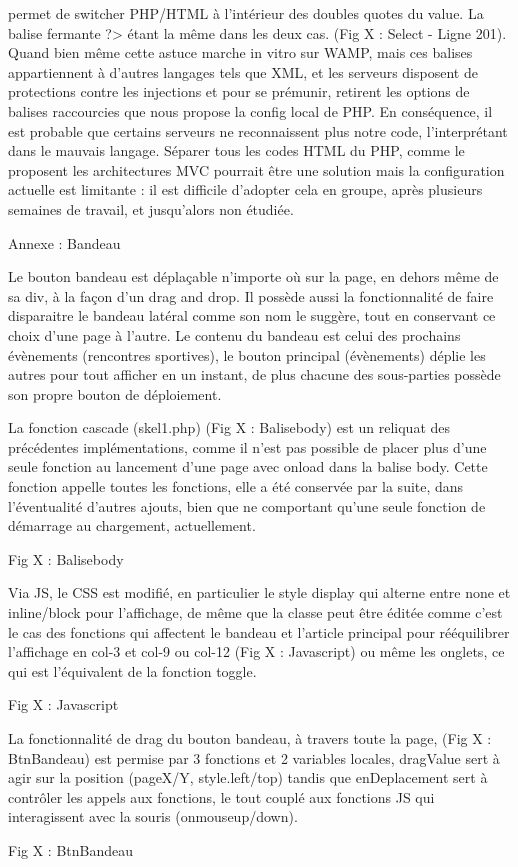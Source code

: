 \documentclass[12pt]{report}
\begin{document}
permet de switcher PHP/HTML à l’intérieur des doubles quotes du value. La balise fermante ?> étant la même dans les deux cas. (Fig X : Select - Ligne 201). Quand bien même cette astuce marche in vitro sur WAMP, mais ces balises appartiennent à d’autres langages tels que XML, et les serveurs disposent de protections contre les injections et pour se prémunir, retirent les options de balises raccourcies que nous propose la config local de PHP. En conséquence, il est probable que certains serveurs ne reconnaissent plus notre code, l’interprétant dans le mauvais langage. Séparer tous les codes HTML du PHP, comme le proposent les architectures MVC pourrait être une solution mais la configuration actuelle est limitante : il est difficile d’adopter cela en groupe, après plusieurs semaines de travail, et jusqu’alors non étudiée.
\bigskip
\par
Annexe : Bandeau
\bigskip
\par
Le bouton bandeau est déplaçable n’importe où sur la page, en dehors même de sa div, à la façon d’un drag and drop. Il possède aussi la fonctionnalité de faire disparaitre le bandeau latéral comme son nom le suggère, tout en conservant ce choix d’une page à l’autre. Le contenu du bandeau est celui des prochains évènements (rencontres sportives), le bouton principal (évènements) déplie les autres pour tout afficher en un instant, de plus chacune des
sous-parties possède son propre bouton de déploiement.
\bigskip
\par
La fonction cascade (skel1.php) (Fig X : Balisebody) est un reliquat des précédentes implémentations, comme il n’est pas possible de placer plus d’une seule fonction au lancement d’une page avec onload dans la balise body. Cette fonction appelle toutes les fonctions, elle a été conservée par la suite, dans l’éventualité d’autres ajouts, bien que ne comportant qu’une seule fonction de démarrage au chargement, actuellement.
\bigskip
\par
Fig X : Balisebody
\bigskip
\par
Via JS, le CSS est modifié, en particulier le style display qui alterne entre none et inline/block pour l’affichage, de même que la classe peut être éditée comme c’est le cas des fonctions qui affectent le bandeau et l’article principal pour rééquilibrer l’affichage en col-3 et col-9 ou col-12
(Fig X : Javascript) ou même les onglets, ce qui est l’équivalent de la fonction toggle.
\bigskip
\par
Fig X : Javascript
\bigskip
\par
La fonctionnalité de drag du bouton bandeau, à travers toute la page, (Fig X : BtnBandeau) est permise par 3 fonctions et 2 variables locales, dragValue sert à agir sur la position (pageX/Y, style.left/top) tandis que enDeplacement sert à contrôler les appels aux fonctions, le tout couplé aux fonctions JS qui interagissent avec la souris (onmouseup/down).
\bigskip
\par
Fig X : BtnBandeau
\bigskip
\par

	

	    
\end{document}

